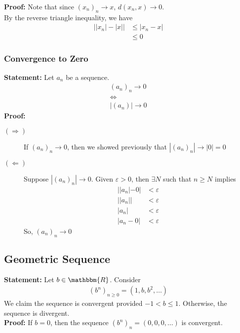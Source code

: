 \documentclass[10pt]{extarticle}
\newcommand{\R}{\mathbbm{R}}
\begin{document}
  \textbf{Proof:} Note that since $(x_n)_n \rightarrow x$, $d(x_n,x) \rightarrow 0$.\\

      By the reverse triangle inequality, we have
      \begin{align*}
        \left||x_n| - |x|\right| &\leq |x_n - x|\\
        &\leq 0
      \end{align*}
  \subsubsection{Convergence to Zero}%
  \textbf{Statement:} Let $a_n$ be a sequence.
    \begin{align*}
      (a_n)_n \rightarrow 0\\
      \Leftrightarrow\\
      |(a_n)| \rightarrow 0
    \end{align*}
    \textbf{Proof:}
    \begin{description}
      \item[$(\Rightarrow)$] If $(a_n)_n \rightarrow 0$, then we showed previously that $|(a_n)_n| \rightarrow |0| = 0$
      \item[$(\Leftarrow)$] Suppose $|(a_n)_n| \rightarrow 0$. Given $\varepsilon > 0$, then $\exists N$ such that $n \geq N$ implies
        \begin{align*}
          ||a_n|-0| &< \varepsilon\\
          ||a_n|| &< \varepsilon\\
          |a_n| &< \varepsilon\\
          |a_n - 0| &< \varepsilon
        \end{align*}
        So, $\left(a_n\right)_n \rightarrow 0$
    \end{description}
  \subsection{Geometric Sequence}%
  \textbf{Statement:} Let $b\in\R$. Consider
    \begin{align*}
      \left(b^n\right)_{n\geq 0} = (1,b,b^2,\dots)
    \end{align*}
    We claim the sequence is convergent provided $-1 < b \leq 1$. Otherwise, the sequence is divergent.\\

    \textbf{Proof:} If $b = 0$, then the sequence $(b^n)_{n} = (0,0,0,\dots)$ is convergent.\\
\end{document}
